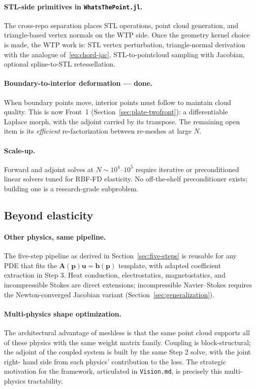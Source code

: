 \documentclass[11pt,a4paper]{article}
\newcommand{\mat}[1]{\mathbf{#1}}
\newcommand{\vect}[1]{\boldsymbol{#1}}
\newcommand{\pts}{\vect{p}}
\begin{document}
\paragraph{STL-side primitives in \texttt{WhatsThePoint.jl}.}
The cross-repo separation places STL operations, point cloud
generation, and triangle-based vertex normals on the WTP side.
Once the geometry kernel choice is made, the WTP work is: STL
vertex perturbation, triangle-normal derivation with the analogue
of~\eqref{eq:chord-jac}, STL-to-pointcloud sampling with
Jacobian, optional spline-to-STL retessellation.

\paragraph{Boundary-to-interior deformation --- done.}
When boundary points move, interior points must follow to maintain cloud quality.
This is now Front~1 (Section~\ref{sec:plate-twofront}): a differentiable Laplace
morph, with the adjoint carried by its transpose. The remaining open item is its
\emph{efficient} re-factorization between re-meshes at large $N$.

\paragraph{Scale-up.}
Forward and adjoint solves at $N \sim 10^4$--$10^5$ require
iterative or preconditioned linear solvers tuned for RBF-FD
elasticity. No off-the-shelf preconditioner exists; building one
is a research-grade subproblem.

\subsection{Beyond elasticity}

\paragraph{Other physics, same pipeline.}
The five-step pipeline as derived in Section~\ref{sec:five-steps}
is reusable for any PDE that fits the
$\mat A(\pts)\vect u = \vect b(\pts)$ template, with adapted
coefficient extraction in Step 3. Heat conduction, electrostatics,
magnetostatics, and incompressible Stokes are direct extensions;
incompressible Navier--Stokes requires the Newton-converged
Jacobian variant (Section~\ref{sec:generalization}).

\paragraph{Multi-physics shape optimization.}
The architectural advantage of meshless is that the same point
cloud supports all of these physics with the same weight matrix
family. Coupling is block-structural; the adjoint of the coupled
system is built by the same Step 2 solve, with the joint right-
hand side from each physics' contribution to the loss. The
strategic motivation for the framework, articulated in
\texttt{Vision.md}, is precisely this multi-physics tractability.
\end{document}
